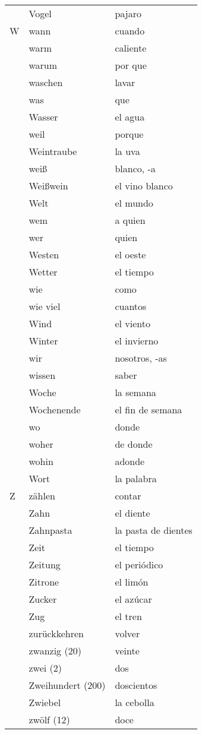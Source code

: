 \documentclass[10pt,spanish]{article}
\begin{document}
\begin{longtable}{p{} p{} | p{}}
& Vogel & pajaro  \\
W & wann & cuando  \\
& warm & caliente  \\
& warum & por que  \\
& waschen & lavar  \\
& was & que  \\
& Wasser & el agua \\
& weil & porque  \\
& Weintraube & la uva \\
& weiß & blanco, -a  \\
& Weißwein & el vino blanco  \\
& Welt & el mundo \\
& wem & a quien  \\
& wer & quien  \\
& Westen & el oeste  \\
& Wetter & el tiempo  \\
& wie & como  \\
& wie viel& cuantos  \\
& Wind & el viento  \\
& Winter & el invierno  \\
& wir & nosotros, -as\\
& wissen & saber  \\
& Woche & la semana  \\
& Wochenende & el fin de semana  \\
& wo & donde  \\
& woher & de donde  \\
& wohin & adonde  \\
& Wort & la palabra \\
Z & zählen & contar  \\
& Zahn & el diente \\
& Zahnpasta & la pasta de dientes \\
& Zeit & el tiempo  \\
& Zeitung & el periódico  \\
& Zitrone & el limón \\
& Zucker & el azúcar  \\
& Zug & el tren  \\
& zurückkehren & volver  \\
& zwanzig (20) & veinte  \\
& zwei (2) & dos  \\
& Zweihundert (200) & doscientos  \\
& Zwiebel & la cebolla  \\
& zwölf (12) & doce \\
\end{longtable}
\end{document}
